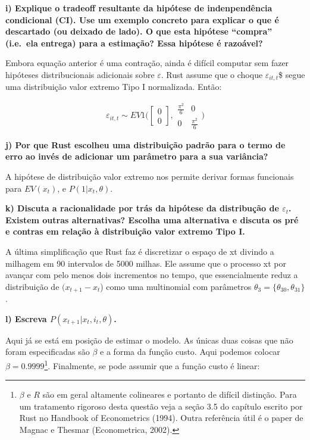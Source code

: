 \documentclass[12pt,a4paper]{article}
\let\rmarkdownfootnote\footnote%
\def\footnote{\protect\rmarkdownfootnote}
\begin{document}
\textbf{i) Explique o tradeoff resultante da hipótese de indenpendência
condicional (CI). Use um exemplo concreto para explicar o que é
descartado (ou deixado de lado). O que esta hipótese ``compra''
(i.e.~ela entrega) para a estimação? Essa hipótese é razoável?}

Embora equação anterior é uma contração, ainda é difícil computar sem
fazer hipóteses distribucionais adicionais sobre \(\varepsilon\). Rust
assume que o choque \(\varepsilon_{it,t}\)\$ segue uma distribuição
valor extremo Tipo I normalizada. Então:

\[
\varepsilon_{it,t} \sim EV1 \Bigg( \begin{bmatrix} 
0   \\ 0 \end{bmatrix}, \begin{matrix} \frac{\pi^2}{6} & 0 \\ 0 & \frac{\pi^2}{6} \end{matrix} \Bigg) 
\]

\textbf{j) Por que Rust escolheu uma distribuição padrão para o termo de
erro ao invés de adicionar um parâmetro para a sua variância?}

A hipótese de distribuição valor extremo nos permite derivar formas
funcionais para \(EV(x_t)\), e \(P(1 | x_t, \theta)\).

\textbf{k) Discuta a racionalidade por trás da hipótese da distribução
de \(\varepsilon_t\). Existem outras alternativas? Escolha uma
alternativa e discuta os pré e contras em relação à distribuição valor
extremo Tipo I.}

A última simplificação que Rust faz é discretizar o espaço de xt divindo
a milhagem em 90 intervalos de 5000 milhas. Ele assume que o processo xt
por avançar com pelo menos dois incrementos no tempo, que essencialmente
reduz a distribuição de \((x_{t+1} - x_t\)) como uma multinomial com
parâmetros \(\theta_3 = \{\theta_{30}, \theta_{31}\}\).

\textbf{l) Escreva \(P (x_{t+1}| x_t, i_t, \theta)\).}

Aqui já se está em posição de estimar o modelo. As únicas duas coisas
que não foram especificadas são \(\beta\) e a forma da função custo.
Aqui podemos colocar \(\beta = 0.9999\)\footnote{\(\beta\) e \(R\) são
  em geral altamente colineares e portanto de difícil distinção. Para um
  tratamento rigoroso desta questão veja a seção 3.5 do capítulo escrito
  por Rust no Handbook of Econometrics (1994). Outra referência útil é o
  paper de Magnac e Thesmar (Econometrica, 2002).}. Finalmente, se pode
assumir que a função custo é linear:
\end{document}
